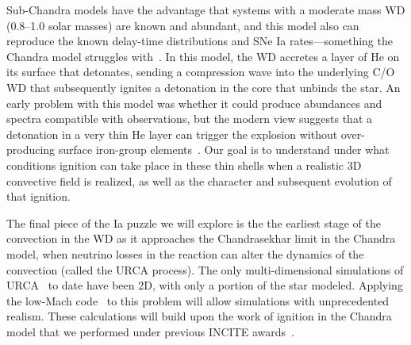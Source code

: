 Sub-Chandra models
have the advantage that systems with a moderate mass WD
(0.8--1.0 solar masses) are known and abundant, and this model also
can reproduce the known delay-time distributions and SNe Ia
rates---something the Chandra model struggles with~\cite{ruiter:2011}.
In this model, the WD accretes a layer of He on its surface
that detonates, sending a compression wave into the underlying C/O WD
that subsequently ignites a detonation in the core that unbinds the
star.  An early problem with this model was whether it 
could produce abundances and spectra compatible with observations, 
but the modern view suggests that a detonation in a very thin He layer
can trigger the explosion without over-producing surface iron-group
elements~\cite{fink:2010}.  Our goal is to understand under what
conditions ignition can take place in these thin shells when a
realistic 3D convective field is realized, as well as the character
and subsequent evolution of that ignition.

The final piece of the Ia puzzle we will explore is the the earliest
stage of the convection in the WD as it approaches the Chandrasekhar
limit in the Chandra model, when neutrino losses in the reaction can
alter the dynamics of the convection (called the URCA process).  The
only multi-dimensional simulations of URCA~\cite{URCA} to date have
been 2D, with only a portion of the star modeled.  Applying the
low-Mach code \maestro\ to this problem will allow simulations with
unprecedented realism.  These calculations will build upon the 
work of ignition in the Chandra model that we performed under
previous INCITE awards~\cite{Non12}.
